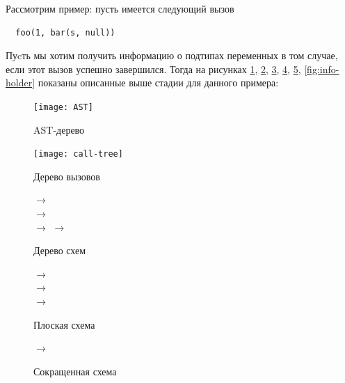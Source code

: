 Рассмотрим пример: пусть имеется следующий вызов

\begin{verbatim}
  foo(1, bar(s, null))
\end{verbatim}

Пуcть мы хотим получить информацию о подтипах переменных в том случае, если этот вызов успешно завершился. Тогда на рисунках \ref{fig:AST-tree}, \ref{fig:call-tree}, \ref{fig:schemas-tree}, \ref{fig:flat-schema}, \ref{fig:reduced-schema}, \ref{fig:info-holder} показаны описанные выше стадии для данного примера:

\begin{figure}[H]
  \texttt{[image: AST]}
  \caption{AST-дерево}
  \label{fig:AST-tree}
\end{figure}

\begin{figure}[H]
  \texttt{[image: call-tree]}
  \caption{Дерево вызовов}
  \label{fig:call-tree}
\end{figure}

\begin{figure}[H]
  {
     $\rightarrow$  \\

    {
       $\rightarrow$  \\
       $\rightarrow$ 
    }
    {
       $\rightarrow$ 
    }
  }
  {}

  \caption{Дерево схем}
  \label{fig:schemas-tree}
\end{figure}

\begin{figure}[H]
  {
     $\rightarrow$  \\

      $\rightarrow$  \\

     $\rightarrow$ 
  }
  {}

  \caption{Плоская схема}
  \label{fig:flat-schema}
\end{figure}

\begin{figure}[H]
  {
     $\rightarrow$ 
  }
  {}

  \caption{Сокращенная схема}
  \label{fig:reduced-schema}
\end{figure}

